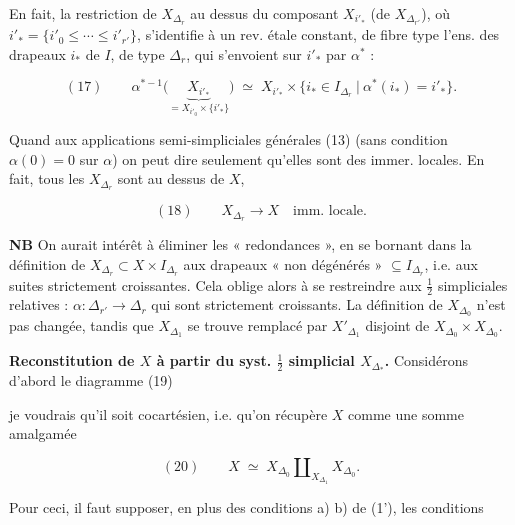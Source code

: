 \documentclass[11pt,a4paper]{article}
\begin{document}
En fait, la  restriction de $X_{\Delta_r}$ au dessus du
composant $X_{i'_{*}}$ (de $X_{\Delta_{r'}}$), où
$i'_{*} = \{ i'_0 \leq \cdots \leq i'_{r'} \}$, \struck{\ill} s'identifie à un
rev. étale constant, de fibre type l'ens. des drapeaux $i_{*}$ de $I$, de type
$\Delta_r$, qui s'envoient sur $i'_{*}$ par $\alpha^{*}$ :

\[
  (17) \qquad
  \alpha^{*-1}\bigl(
    \underbrace{X_{i'_{*}}}_{\textstyle = X_{i'_0} \times \{i'_{*}\}}
  \bigr)
  \;\simeq\;
  X_{i'_{*}} \times
  \bigl\{ i_{*} \in I_{\Delta_r} \ \big|\ \alpha^{*}(i_{*}) = i'_{*} \bigr\} .
\]

Quand aux applications semi-simpliciales générales (13) (sans condition
$\alpha(0) = 0$ sur $\alpha$) on peut dire seulement qu'elles sont des immer.
locales. En fait, tous les $X_{\Delta_r}$ sont au dessus de $X$,

\[
  (18) \qquad X_{\Delta_r} \longrightarrow X \quad \text{imm. locale.}
\]

\textbf{NB} On aurait intérêt à éliminer les \struck{\ill} « redondances », en
se bornant dans la définition de $X_{\Delta_r} \subset X \times I_{\Delta_r}$
aux drapeaux « non dégénérés »  $\subseteq I_{\Delta_r}$, i.e. aux
suites strictement croissantes. Cela oblige alors à se restreindre aux
 $\tfrac{1}{2}$ simpliciales relatives : 
$\alpha : \Delta_{r'} \to \Delta_r$ qui sont strictement croissants. La
définition de $X_{\Delta_0}$ n'est pas changée, tandis que $X_{\Delta_1}$ se
trouve remplacé par $X'_{\Delta_1}$ disjoint de
$X_{\Delta_0} \times X_{\Delta_0}$.



\textbf{Reconstitution de $X$ à partir du syst. $\tfrac{1}{2}$ simplicial
$X_{\Delta_{*}}$.} Considérons d'abord le diagramme (19)


je voudrais qu'il soit cocartésien, i.e. qu'on récupère $X$ comme une somme
amalgamée

\[
  (20) \qquad X \;\simeq\; X_{\Delta_0} \amalg_{X_{\Delta_1}} X_{\Delta_0} .
\]

Pour ceci, il faut supposer, en plus des conditions a) b) de (1'), les
conditions
\end{document}
